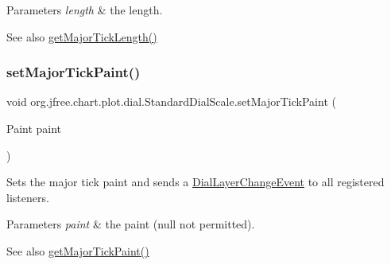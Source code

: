 \begin{DoxyParams}{Parameters}
{\em length} & the length.\\
\hline
\end{DoxyParams}
\begin{DoxySeeAlso}{See also}
\mbox{\hyperlink{classorg_1_1jfree_1_1chart_1_1plot_1_1dial_1_1_standard_dial_scale_a075e82dfa28d221b97a512fb10469e64}{get\+Major\+Tick\+Length()}} 
\end{DoxySeeAlso}
\mbox{\label{classorg_1_1jfree_1_1chart_1_1plot_1_1dial_1_1_standard_dial_scale_a5a0156ff2213c5ad5cf20ffc4bee3f20}} 
\subsubsection{\texorpdfstring{set\+Major\+Tick\+Paint()}{setMajorTickPaint()}}
{\footnotesize\ttfamily void org.\+jfree.\+chart.\+plot.\+dial.\+Standard\+Dial\+Scale.\+set\+Major\+Tick\+Paint (\begin{DoxyParamCaption}\item[{Paint}]{paint }\end{DoxyParamCaption})}

Sets the major tick paint and sends a \mbox{\hyperlink{classorg_1_1jfree_1_1chart_1_1plot_1_1dial_1_1_dial_layer_change_event}{Dial\+Layer\+Change\+Event}} to all registered listeners.


\begin{DoxyParams}{Parameters}
{\em paint} & the paint ({\ttfamily null} not permitted).\\
\hline
\end{DoxyParams}
\begin{DoxySeeAlso}{See also}
\mbox{\hyperlink{classorg_1_1jfree_1_1chart_1_1plot_1_1dial_1_1_standard_dial_scale_a0c8dca20d8b757432a694aae2ae75267}{get\+Major\+Tick\+Paint()}} 
\end{DoxySeeAlso}
\mbox{\label{classorg_1_1jfree_1_1chart_1_1plot_1_1dial_1_1_standard_dial_scale_a4c6d4803607415d70ea1219befec466a}} 
